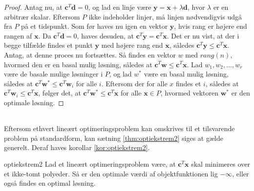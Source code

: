 \begin{proof}
Antag nu, at $\textbf{c}^T \textbf{d} = 0$, og lad en linje være $\textbf{y} = \textbf{x} + \lambda \textbf{d}$, hvor $ \lambda $ er en arbitrær skalar. 
Eftersom $P$ ikke indeholder linjer, må linjen nødvendigvis udgå fra $P$ på et tidspunkt. 
Som før haves nu igen en vektor $\textbf{y}$, hvis rang er højere end rangen af $\textbf{x}$. 
Da $\textbf{c}^T \textbf{d} = 0$, haves desuden, at $\textbf{c}^T \textbf{y} = \textbf{c}^T \textbf{x}$. 
Det er nu vist, at der i begge tilfælde findes et punkt $\textbf{y}$ med højere rang end $\textbf{x}$, således $\textbf{c}^T \textbf{y} \leq \textbf{c}^T \textbf{x}$. 
Antag, at denne proces nu fortsættes.
Så findes en vektor $w$ med $rang(n)$, hvormed den er en basal mulig løsning, således at $\textbf{c}^T \textbf{w} \leq \textbf{c}^T \textbf{x}$. 
Lad $w_1, w_2, \ldots , w_r$ være de basale mulige løsninger i $P$, og lad $w^*$ være en basal mulig løsning, således at $\textbf{c}^T \textbf{w}^* \leq \textbf{c}^T \textbf{w}_i$ for alle $i$. 
Eftersom der for alle $x$ findes et $i$, således at $\textbf{c}^T \textbf{w}_i \leq \textbf{c}^T \textbf{x}$, følger det, at $\textbf{c}^T \textbf{w}^* \leq \textbf{c}^T \textbf{x}$ for alle $\textbf{x} \in P$, hvormed vektoren $\textbf{w}^*$ er den optimale løsning. 
\end{proof}\\
%
Eftersom ethvert lineært optimeringsproblem kan omskrives til et tilsvarende problem på standardform, kan sætning \ref{thm:optiekstrem2} siges at gælde generelt. 
Deraf haves korollar \ref{kor:optiekstrem2}. 
%
\begin{kor}{}{optiekstrem2}
Lad et lineært optimeringsproblem være, at $\textbf{c}^T \textbf{x}$ skal minimeres over et ikke-tomt polyeder.
Så er den optimale værdi af objektfunktionen lig $- \infty$, eller også findes en optimal løsning. 
\end{kor}
%
%